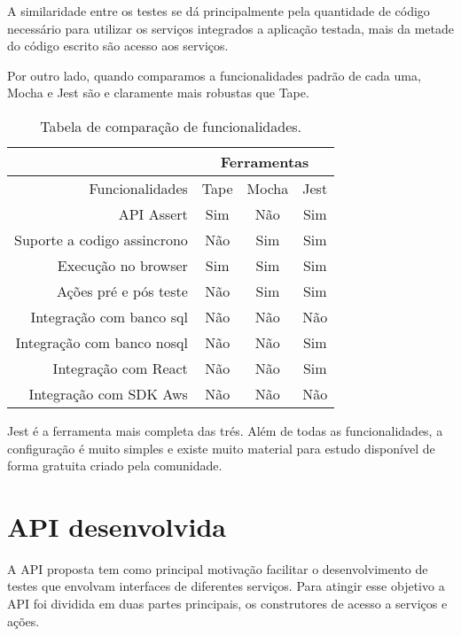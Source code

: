 \documentclass[10pt,brazil,english]{article}
\begin{document}
A similaridade entre os testes se dá principalmente pela quantidade de código necessário para utilizar os serviços integrados a aplicação testada, mais da metade do código escrito são acesso aos serviços.

Por outro lado, quando comparamos a funcionalidades padrão de cada uma, Mocha e Jest são e claramente mais robustas que Tape. 

\begin{table}[!hbtp]
\centering
\begin{tabular}{r|c|c|c|}
\cline{2-4}
\multicolumn{1}{l|}{}                             & \multicolumn{3}{c|}{Ferramentas} \\ \hline
\multicolumn{1}{|r|}{Funcionalidades}             & Tape       & Mocha       & Jest       \\ \hline
\multicolumn{1}{|r|}{API Assert}                  & Sim        & Não         & Sim        \\ \hline
\multicolumn{1}{|r|}{Suporte a codigo assincrono} & Não        & Sim         & Sim        \\ \hline
\multicolumn{1}{|r|}{Execução no browser}         & Sim        & Sim         & Sim        \\ \hline
\multicolumn{1}{|r|}{Ações pré e pós teste}       & Não        & Sim         & Sim        \\ \hline
\multicolumn{1}{|r|}{Integração com banco sql}    & Não        & Não         & Não        \\ \hline
\multicolumn{1}{|r|}{Integração com banco nosql}  & Não        & Não         & Sim        \\ \hline
\multicolumn{1}{|r|}{Integração com React}        & Não        & Não         & Sim        \\ \hline
\multicolumn{1}{|r|}{Integração com SDK Aws}      & Não        & Não         & Não        \\ \hline

\end{tabular}
\caption{Tabela de comparação de funcionalidades.}
\label{tab:comparacao-funcionalidades}
\end{table}

Jest é a ferramenta mais completa das trés. Além de todas as funcionalidades, a configuração é muito simples e existe muito material para estudo disponível de forma gratuita criado pela comunidade. 

\section{API desenvolvida}
A API proposta tem como principal motivação facilitar o desenvolvimento de testes que envolvam interfaces de diferentes serviços. Para atingir esse objetivo a API foi dividida em duas partes principais, os construtores de acesso a serviços e ações.
\end{document}
